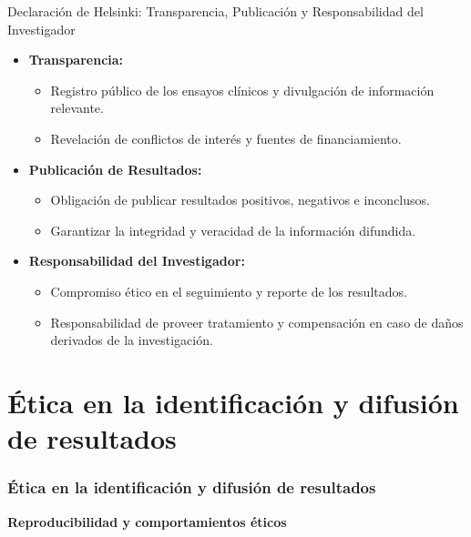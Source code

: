 ﻿\documentclass{beamer}
\begin{document}
\begin{frame}{Declaración de Helsinki: Transparencia, Publicación y Responsabilidad del Investigador}
\begin{itemize}
    \item \textbf{Transparencia:}
    \begin{itemize}
         \item Registro público de los ensayos clínicos y divulgación de información relevante.
         \item Revelación de conflictos de interés y fuentes de financiamiento.
    \end{itemize}
    \item \textbf{Publicación de Resultados:}
    \begin{itemize}
         \item Obligación de publicar resultados positivos, negativos e inconclusos.
         \item Garantizar la integridad y veracidad de la información difundida.
    \end{itemize}
    \item \textbf{Responsabilidad del Investigador:}
    \begin{itemize}
         \item Compromiso ético en el seguimiento y reporte de los resultados.
         \item Responsabilidad de proveer tratamiento y compensación en caso de daños derivados de la investigación.
    \end{itemize}
\end{itemize}
\end{frame}

\section{Ética en la identificación y difusión de resultados}

\begin{frame}
    \frametitle{Ética en la identificación y difusión de resultados}
    \centering
    \textbf{\Large Reproducibilidad y comportamientos éticos}
    \vspace{0.5cm}
\end{frame}
\end{document}
